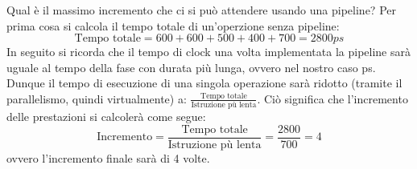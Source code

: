 \documentclass[class=book, crop=false, oneside]{standalone}
\begin{document}
Qual è il massimo incremento che ci si può attendere usando una pipeline?
Per prima cosa si calcola il tempo totale di un'operzione senza pipeline:
\begin{equation*}
	\text{Tempo totale} = 600+600+500+400+700 = 2800ps
\end{equation*}
In seguito si ricorda che il tempo di clock una volta implementata la pipeline sarà uguale al tempo della fase con durata più lunga, ovvero nel nostro caso \unit[700]{ps}. Dunque il tempo di esecuzione di una singola operazione sarà ridotto (tramite il parallelismo, quindi virtualmente) a: \(\frac{\text{Tempo totale}}{\text{Istruzione pù lenta}}\). Ciò significa che l'incremento delle prestazioni si calcolerà come segue:
\begin{equation*}
	\text{Incremento} = \frac{\text{Tempo totale}}{\text{Istruzione pù lenta}} = \frac{2800}{700} = 4
\end{equation*}
ovvero l'incremento finale sarà di 4 volte.
\end{document}
